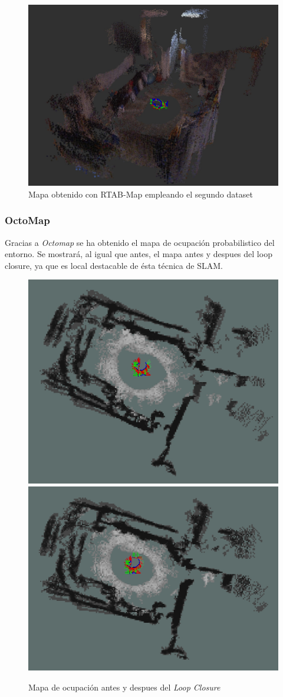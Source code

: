 \begin{figure}[h!]
    \centering
    \includegraphics[width=.9\textwidth]{images/slam/bag3_rtabmapbonito}
    \caption{Mapa obtenido con RTAB-Map empleando el segundo dataset}
\end{figure}


\subsubsection{OctoMap}
Gracias a \textit{Octomap} se ha obtenido el mapa de ocupación probabilistico del entorno. Se mostrará, al igual que antes, el mapa antes y despues del loop closure, ya que es local
destacable de ésta técnica de SLAM.
\begin{figure}[h!]
    \centering
    \includegraphics[width=.4\textwidth]{images/slam/bag3_occupGrid_noLC}
    \includegraphics[width=.435\textwidth]{images/slam/bag3_occupGrid_LC}
    \caption{Mapa de ocupación antes y despues del \textit{Loop Closure}}
\end{figure}

